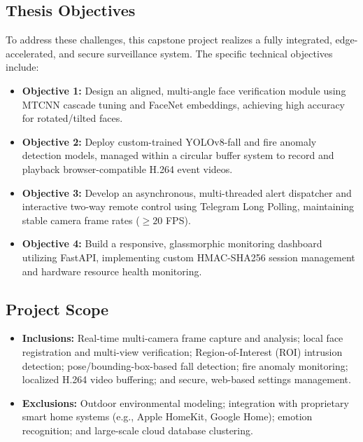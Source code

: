 \documentclass[12pt,a4paper]{article}
\begin{document}
\subsection{Thesis Objectives}
To address these challenges, this capstone project realizes a fully integrated, edge-accelerated, and secure surveillance system. The specific technical objectives include:
\begin{itemize}
    \item \textbf{Objective 1:} Design an aligned, multi-angle face verification module using MTCNN cascade tuning and FaceNet embeddings, achieving high accuracy for rotated/tilted faces.
    \item \textbf{Objective 2:} Deploy custom-trained YOLOv8-fall and fire anomaly detection models, managed within a circular buffer system to record and playback browser-compatible H.264 event videos.
    \item \textbf{Objective 3:} Develop an asynchronous, multi-threaded alert dispatcher and interactive two-way remote control using Telegram Long Polling, maintaining stable camera frame rates ($\ge 20$ FPS).
    \item \textbf{Objective 4:} Build a responsive, glassmorphic monitoring dashboard utilizing FastAPI, implementing custom HMAC-SHA256 session management and hardware resource health monitoring.
\end{itemize}

\subsection{Project Scope}
\begin{itemize}
    \item \textbf{Inclusions:} Real-time multi-camera frame capture and analysis; local face registration and multi-view verification; Region-of-Interest (ROI) intrusion detection; pose/bounding-box-based fall detection; fire anomaly monitoring; localized H.264 video buffering; and secure, web-based settings management.
    \item \textbf{Exclusions:} Outdoor environmental modeling; integration with proprietary smart home systems (e.g., Apple HomeKit, Google Home); emotion recognition; and large-scale cloud database clustering.
\end{itemize}
\end{document}
